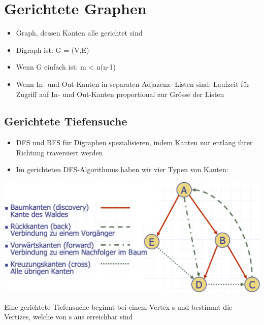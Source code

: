\section{Gerichtete Graphen}
\begin{itemize}
    \item Graph, dessen Kanten alle gerichtet sind
    \item Digraph ist: G = (V,E)
    \item Wenn G einfach ist: m < n(n-1)
    \item Wenn In- und Out-Kanten in separaten Adjazenz- Listen sind: Laufzeit für Zugriff auf In- und Out-Kanten proportional zur Grösse der Listen
\end{itemize}

\subsection{Gerichtete Tiefensuche}
\begin{itemize}
    \item DFS und BFS für Digraphen spezialisieren, indem Kanten nur entlang ihrer Richtung traversiert werden
    \item Im gerichteten DFS-Algorithmus haben wir vier Typen von Kanten:
\end{itemize}
\vspace{-8pt}
\begin{center}
    \includegraphics[scale=.28]{graphic/14 Digraphs/Gerichtete Tiefensuche.png}
\end{center}
\vspace{-8pt}
Eine gerichtete Tiefensuche beginnt bei einem Vertex s und bestimmt die Vertizes, welche von s aus erreichbar sind

